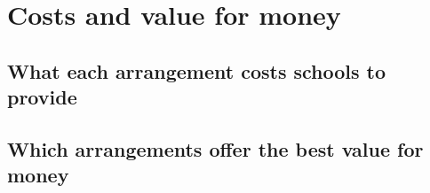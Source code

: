 \chapter{Costs and value for money}


\section{What each arrangement costs schools to provide}

\section{Which arrangements offer the best value for money}
